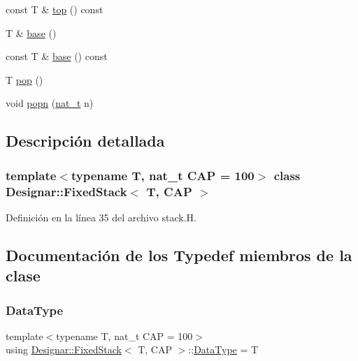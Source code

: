 \begin{DoxyCompactItemize}
\item 
const T \& \hyperlink{class_designar_1_1_fixed_stack_a02582f09d4935d315b28da7ae93db0b3}{top} () const
\item 
T \& \hyperlink{class_designar_1_1_fixed_stack_a01f5207d31f8bbad380ea6923a0bbb80}{base} ()
\item 
const T \& \hyperlink{class_designar_1_1_fixed_stack_a27e6b0668b52af53a224a0e8fcd4b719}{base} () const
\item 
T \hyperlink{class_designar_1_1_fixed_stack_aec21fd8a87337b86e866370b9ed48d1c}{pop} ()
\item 
void \hyperlink{class_designar_1_1_fixed_stack_a9df4fb5afc82545ef1a27eb71bdd84cd}{popn} (\hyperlink{namespace_designar_aa72662848b9f4815e7bf31a7cf3e33d1}{nat\+\_\+t} n)
\end{DoxyCompactItemize}


\subsection{Descripción detallada}
\subsubsection*{template$<$typename T, nat\+\_\+t C\+AP = 100$>$\newline
class Designar\+::\+Fixed\+Stack$<$ T, C\+A\+P $>$}



Definición en la línea 35 del archivo stack.\+H.



\subsection{Documentación de los \textquotesingle{}Typedef\textquotesingle{} miembros de la clase}
\mbox{\label{class_designar_1_1_fixed_stack_a4f0d06b958131d97f8084e7961d51577}} 
\subsubsection{\texorpdfstring{Data\+Type}{DataType}}
{\footnotesize\ttfamily template$<$typename T, nat\+\_\+t C\+AP = 100$>$ \\
using \hyperlink{class_designar_1_1_fixed_stack}{Designar\+::\+Fixed\+Stack}$<$ T, C\+AP $>$\+::\hyperlink{class_designar_1_1_fixed_stack_a4f0d06b958131d97f8084e7961d51577}{Data\+Type} =  T}



